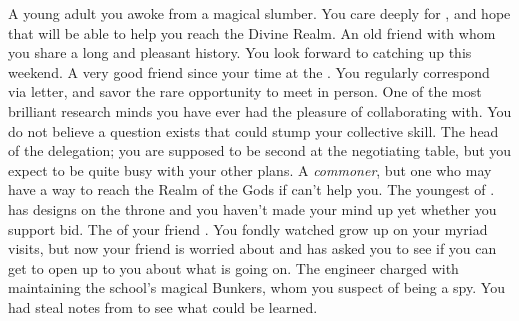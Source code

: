 \documentclass[char]{GL2020}
\begin{document}
\begin{contacts}
    \contact{\cDisney{}} A young adult you awoke from a magical slumber. You care deeply for \cDisney{\them}, and hope that \cDisney{\they} will be able to help you reach the Divine Realm.
    \contact{\cHistory{}} An old friend with whom you share a long and pleasant history. You look forward to catching up this weekend.
    \contact{\cHedonist{}} A very good friend since your time at the \pSchool{}. You regularly correspond via letter, and savor the rare opportunity to meet in person. 
    \contact{\cLibrarian{}} One of the most brilliant research minds you have ever had the pleasure of collaborating with. You do not believe a question exists that could stump your collective skill.
    \contact{\cEvil{}} The head of the \pFarm{} delegation; you are supposed to be \cEvil{\their} second at the negotiating table, but you expect to be quite busy with your other plans.
    \contact{\cCurse{}} A \emph{commoner}, but one who may have a way to reach the Realm of the Gods if \cDisney{} can’t help you.
    \contact{\cPrince{}} The youngest \cPrince{\offspring} of \cQueen{\Monarch} \cQueen{}. \cPrince{} has designs on the throne and you haven’t made your mind up yet whether you support \cPrince{\their} bid.
    \contact{\cChupStudent{}} The \cChupStudent{\child} of your friend \cWildCardFriend{}. You fondly watched \cChupStudent{\them} grow up on your myriad visits, but now your friend is worried about \cChupStudent{} and has asked you to see if you can get \cChupStudent{\them} to open up to you about what is going on.
    \contact{\cBunker{}} The \pShippie{} engineer charged with maintaining the school’s magical Bunkers, whom you suspect of being a spy. You had \cDisney{} steal notes from \cBunker{\them} to see what could be learned.
\end{contacts}
\end{document}
